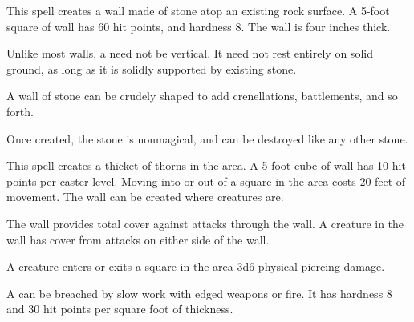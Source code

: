\begin{spellheader}
\end{spellheader}
\begin{spelleffects}
    \spelleffect This spell creates a wall made of stone atop an existing rock surface. A 5-foot square of wall has 60 hit points, and hardness 8. The wall is four inches thick.
    \par Unlike most walls, a  need not be vertical. It need not rest entirely on solid ground, as long as it is solidly supported by existing stone.
    \par A wall of stone can be crudely shaped to add crenellations, battlements, and so forth.
\end{spelleffects}
\begin{spellfooter}
    \spellnotes Once created, the stone is nonmagical, and can be destroyed like any other stone.
\end{spellfooter}

\begin{spellheader}
    \spelldur{\durlong \dismissable}
    \spelleffect This spell creates a thicket of thorns in the area. A 5-foot cube of wall has 10 hit points per caster level. Moving into or out of a square in the area costs 20 feet of movement. The wall can be created where creatures are.

    The wall provides total cover against attacks through the wall. A creature in the wall has cover from attacks on either side of the wall.
\end{spellheader}
\begin{spelleffects}
    \begin{spelltrigger}{A creature enters or exits a square in the area}
        \spelleffect 3d6 physical piercing damage.
    \end{spelltrigger}
\end{spelleffects}
\begin{spellfooter}
    \spellnotes A  can be breached by slow work with edged weapons or fire. It has hardness 8 and 30 hit points per square foot of thickness.
\end{spellfooter}

